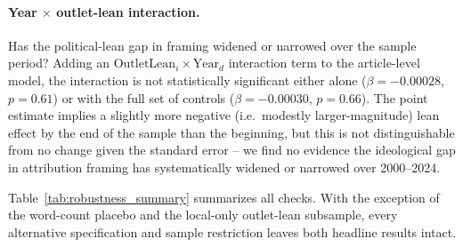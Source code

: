 \documentclass[12pt]{article}
\begin{document}
\paragraph{Year $\times$ outlet-lean interaction.} Has the political-lean
gap in framing widened or narrowed over the sample period? Adding an
$\text{OutletLean}_i \times \text{Year}_d$ interaction term to the
article-level model, the interaction is not statistically significant
either alone ($\beta=-0.00028$, $p=0.61$) or with the full set of controls
($\beta=-0.00030$, $p=0.66$). The point estimate implies a slightly more
negative (i.e.\ modestly larger-magnitude) lean effect by the end of the
sample than the beginning, but this is not distinguishable from no change
given the standard error -- we find no evidence the ideological gap in
attribution framing has systematically widened or narrowed over
2000--2024.

Table~\ref{tab:robustness_summary} summarizes all checks. With the
exception of the word-count placebo and the local-only outlet-lean
subsample, every alternative specification and sample restriction leaves
both headline results intact.
\end{document}
